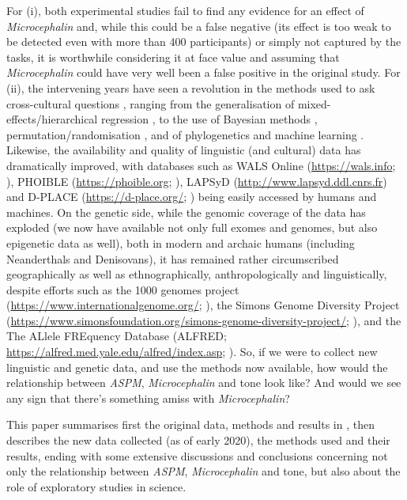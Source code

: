 \documentclass[twoside,twocolumn]{article}
\begin{document}
For (i), both experimental studies \citep{wong_plosone_2012,wong_sciadv_2020} fail to find any evidence for an effect of \textit{Microcephalin} and, while this could be a false negative (its effect is too weak to be detected even with more than 400 participants) or simply not captured by the tasks, it is worthwhile considering it at face value and assuming that \textit{Microcephalin} could have very well been a false positive in the original \citet{dediu_ladd_2007} study.
For (ii), the intervening years have seen a revolution in the methods used to ask cross-cultural questions \citep{ladd_correlational_2015}, ranging from the generalisation of mixed-effects/hierarchical regression \citep{jaeger_mixed_2011,gelman_data_2006}, to the use of Bayesian methods \citep{blasi_human_2019,mcelreath_statistical_2020}, permutation/randomisation \citep{janssen_randomization_2006}, and of phylogenetics \citep{bouckaert_mapping_2012} and machine learning \citep{her_statistical_2020}.
Likewise, the availability and quality of linguistic (and cultural) data has dramatically improved, with databases such as WALS Online (\url{https://wals.info}; \citealp{dryer_wals_2013}), PHOIBLE (\url{https://phoible.org}; \citealp{moran_phoible_2014}), LAPSyD (\url{http://www.lapsyd.ddl.cnrs.fr}) and D-PLACE (\url{https://d-place.org/}; \citealp{kirby_dplace_2016}) being easily accessed by humans and machines.
On the genetic side, while the genomic coverage of the data has exploded (we now have available not only full exomes and genomes, but also epigenetic data as well), both in modern and archaic humans (including Neanderthals and Denisovans), it has remained rather circumscribed geographically as well as ethnographically, anthropologically and linguistically, despite efforts such as the 1000 genomes project (\url{https://www.internationalgenome.org/}; \citealp{the_1000_genomes_2015}), the Simons Genome Diversity Project (\url{https://www.simonsfoundation.org/simons-genome-diversity-project/}; \citealp{mallick_simons_2016}), and the The ALlele FREquency Database (ALFRED; \url{https://alfred.med.yale.edu/alfred/index.asp}; \citealp{rajeevan_alfred_2003}).
So, if we were to collect new linguistic and genetic data, and use the methods now available, how would the relationship between \textit{ASPM}, \textit{Microcephalin} and tone look like?
And would we see any sign that there's something amiss with \textit{Microcephalin}?

This paper summarises first the original data, methods and results in \citet{dediu_ladd_2007}, then describes the new data collected (as of early 2020), the methods used and their results, ending with some extensive discussions and conclusions concerning not only the relationship between \textit{ASPM}, \textit{Microcephalin} and tone, but also about the role of exploratory studies in science.
\end{document}

